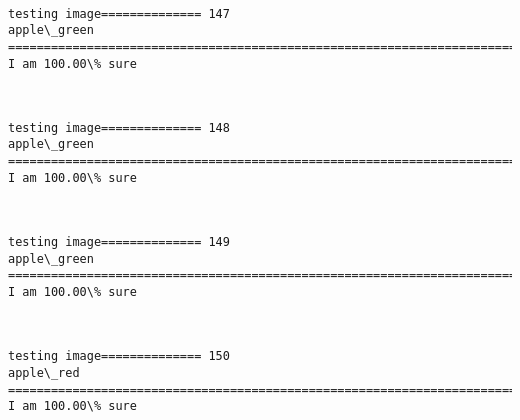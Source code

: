 \documentclass[11pt]{article}
\begin{document}
    \begin{center}
    \end{center}
    { \hspace*{\fill} \\}
    
    \begin{Verbatim}[commandchars=\\\{\}]
testing image============== 147
apple\_green
============================================================================
I am 100.00\% sure

    \end{Verbatim}

    \begin{center}
    \end{center}
    { \hspace*{\fill} \\}
    
    \begin{Verbatim}[commandchars=\\\{\}]
testing image============== 148
apple\_green
============================================================================
I am 100.00\% sure

    \end{Verbatim}

    \begin{center}
    \end{center}
    { \hspace*{\fill} \\}
    
    \begin{Verbatim}[commandchars=\\\{\}]
testing image============== 149
apple\_green
============================================================================
I am 100.00\% sure

    \end{Verbatim}

    \begin{center}
    \end{center}
    { \hspace*{\fill} \\}
    
    \begin{Verbatim}[commandchars=\\\{\}]
testing image============== 150
apple\_red
============================================================================
I am 100.00\% sure

    \end{Verbatim}
\end{document}
